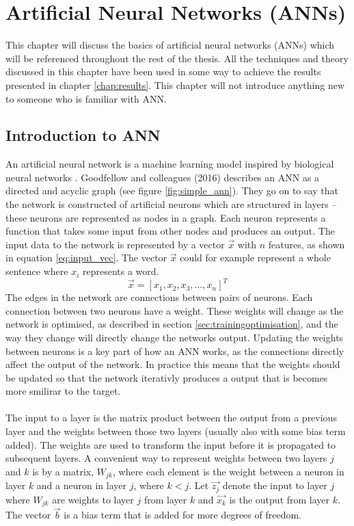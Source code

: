 \chapter{Artificial Neural Networks (ANNs)}\label{chap:ann}
This chapter will discuss the basics of artificial neural networks (ANNs) which will be referenced throughout the rest of the thesis. All the techniques and theory discussed in this chapter have been used in some way to achieve the results presented in chapter \ref{chap:results}. This chapter will not introduce anything new to someone who is familiar with ANN.

\section{Introduction to ANN}
An artificial neural network is a machine learning model inspired by biological neural networks \parencite{lippmann1987introduction}.  Goodfellow and colleagues (2016) describes an ANN as a directed and acyclic graph (see figure \ref{fig:simple_ann}). They go on to say that the network is constructed of artificial neurons which are structured in layers -- these neurons are represented as nodes in a graph. Each neuron represents a function that takes some input from other nodes and produces an output. The input data to the network is represented by a vector $\vec{x}$ with $n$ features, as shown in equation \ref{eq:input_vec}. The vector $\vec{x}$ could for example represent a whole sentence where $x_i$ represents a word.
\begin{equation}\label{eq:input_vec}
    \vec{x} = [x_1, x_2, x_3, \dots , x_n]^T
\end{equation}
The edges in the network are connections between pairs of neurons. Each connection between two neurons have a weight. These weights will change as the network is optimised, as described in section \ref{sec:trainingoptimisation}, and the way they change will directly change the networks output. Updating the weights between neurons is a key part of how an ANN works, as the connections directly affect the output of the network. In practice this means that the weights should be updated so that the network iterativly produces a output that is becomes more smilirar to the target. 
\\\\
The input to a layer is the matrix product between the output from a previous layer and the weights between those two layers (usually also with some bias term added). The weights are used to transform the input before it is propagated to subsequent layers. A convenient way to represent weights between two layers $j$ and $k$ is by a matrix, $W_{jk}$, where each element is the weight between a neuron in layer $k$ and a neuron in layer $j$, where $k<j$. Let $\vec{z_j}$ denote the input to layer $j$ where $W_{jk}$ are weights to layer $j$ from layer $k$ and $\vec{x_k}$ is the output from layer $k$. The vector $\vec{b}$ is a bias term that is added for more degrees of freedom. 
